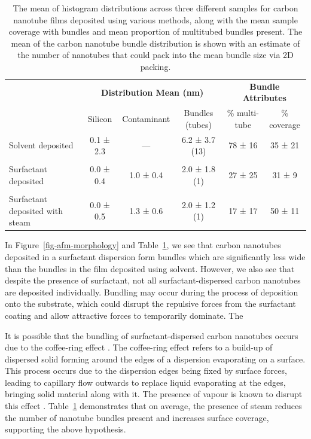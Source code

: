 \documentclass[
  a4paper,
]{scrbook}
\begin{document}
\hypertarget{tbl-histogram-parameters}{}
\begin{table}
\caption{\label{tbl-histogram-parameters}The mean of histogram distributions across three different samples for
carbon nanotube films deposited using various methods, along with the
mean sample coverage with bundles and mean proportion of multitubed
bundles present. The mean of the carbon nanotube bundle distribution is
shown with an estimate of the number of nanotubes that could pack into
the mean bundle size via 2D packing. }\tabularnewline

\centering
\begin{tabular}{>{\raggedright\arraybackslash}p{2cm}ccccc}
\toprule
\multicolumn{1}{c}{\textbf{ }} & \multicolumn{3}{c}{\textbf{Distribution Mean (nm)}} & \multicolumn{2}{c}{\textbf{Bundle Attributes}} \\
\cmidrule(l{3pt}r{3pt}){2-4} \cmidrule(l{3pt}r{3pt}){5-6}
 & Silicon & Contaminant & Bundles (tubes) & \% multi-tube & \% coverage\\
\midrule
Solvent deposited & 0.1 ± 2.3 & — & 6.2 ± 3.7 (13) & 78 ± 16 & 35 ± 21\\
 &  &  &  &  \vphantom{1} & \\
Surfactant deposited & 0.0 ± 0.4 & 1.0 ± 0.4 & 2.0 ± 1.8 (1) & 27 ± 25 & 31 ± 9\\
 &  &  &  &  & \\
Surfactant deposited with steam & 0.0 ± 0.5 & 1.3 ± 0.6 & 2.0 ± 1.2 (1) & 17 ± 17 & 50 ± 11\\
\bottomrule
\end{tabular}
\end{table}

In Figure~\ref{fig-afm-morphology} and
Table~\ref{tbl-histogram-parameters}, we see that carbon nanotubes
deposited in a surfactant dispersion form bundles which are
significantly less wide than the bundles in the film deposited using
solvent. However, we also see that despite the presence of surfactant,
not all surfactant-dispersed carbon nanotubes are deposited
individually. Bundling may occur during the process of deposition onto
the substrate, which could disrupt the repulsive forces from the
surfactant coating and allow attractive forces to temporarily dominate.
The

It is possible that the bundling of surfactant-dispersed carbon
nanotubes occurs due to the coffee-ring effect
\autocite{Deegan1997,VanGaalen2021}. The coffee-ring effect refers to a
build-up of dispersed solid forming around the edges of a dispersion
evaporating on a surface. This process occurs due to the dispersion
edges being fixed by surface forces, leading to capillary flow outwards
to replace liquid evaporating at the edges, bringing solid material
along with it. The presence of vapour is known to disrupt this effect
\autocite{Bishop2020}. Table~\ref{tbl-histogram-parameters} demonstrates
that on average, the presence of steam reduces the number of nanotube
bundles present and increases surface coverage, supporting the above
hypothesis.
\end{document}
